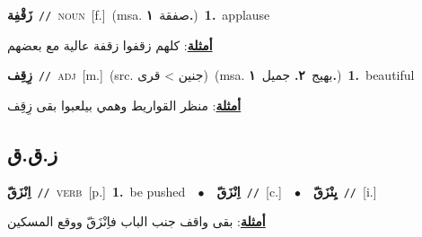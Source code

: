 \documentclass[10pt,a4paper,twoside]{article} %
\begin{document}
\begin{multicols}{2}
{\setlength\topsep{0pt}\textbf{\foreignlanguage{arabic}{زَقْفِة}}\ {\color{gray}\texttt{//}\color{black}}\ \textsc{noun}\ [f.]\ \color{gray}(msa. \foreignlanguage{arabic}{صفقة}~\foreignlanguage{arabic}{\textbf{١.}})\color{black}\ \textbf{1.}~applause\  \begin{flushright}\color{gray}\foreignlanguage{arabic}{\textbf{\underline{\foreignlanguage{arabic}{أمثلة}}}: كلهم زقفوا زقفة عالية مع بعضهم}\end{flushright}\color{black}} \vspace{2mm}

{\setlength\topsep{0pt}\textbf{\foreignlanguage{arabic}{زِقِف}}\ {\color{gray}\texttt{//}\color{black}}\ \textsc{adj}\ [m.]\ (src. \color{gray}\foreignlanguage{arabic}{جنين > قرى}\color{black})\ \color{gray}(msa. \foreignlanguage{arabic}{بهيج}~\foreignlanguage{arabic}{\textbf{٢.}}  \foreignlanguage{arabic}{جميل}~\foreignlanguage{arabic}{\textbf{١.}})\color{black}\ \textbf{1.}~beautiful\  \begin{flushright}\color{gray}\foreignlanguage{arabic}{\textbf{\underline{\foreignlanguage{arabic}{أمثلة}}}: منظر القواريط وهمي بيلعبوا بقى زِقِف}\end{flushright}\color{black}} \vspace{2mm}

\vspace{-3mm}
\subsection*{\color{blue}\foreignlanguage{arabic}{ز.ق.ق}\color{blue}{}} 

{\setlength\topsep{0pt}\textbf{\foreignlanguage{arabic}{اِنْزَقّ}}\ {\color{gray}\texttt{//}\color{black}}\ \textsc{verb}\ [p.]\ \textbf{1.}~be pushed\ \ $\bullet$\ \ \setlength\topsep{0pt}\textbf{\foreignlanguage{arabic}{اِنْزَقّ}}\ {\color{gray}\texttt{//}\color{black}}\ [c.]\ \ $\bullet$\ \ \setlength\topsep{0pt}\textbf{\foreignlanguage{arabic}{يِنْزَقّ}}\ {\color{gray}\texttt{//}\color{black}}\ [i.]\  \begin{flushright}\color{gray}\foreignlanguage{arabic}{\textbf{\underline{\foreignlanguage{arabic}{أمثلة}}}: بقى واقف جنب الباب فاِنْزَقّ ووقع المسكين}\end{flushright}\color{black}} \vspace{2mm}


\end{multicols}
\end{document}
